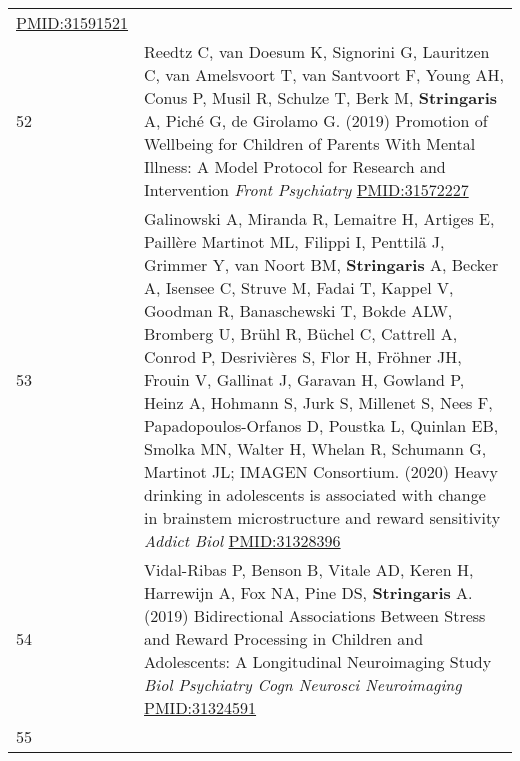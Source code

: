 \documentclass[
]{article}
\begin{document}
\begin{longtable}[]{@{}ll@{}}
\begin{minipage}[t]{0.94\columnwidth}
\url{PMID:31591521}\strut
\end{minipage}\tabularnewline
\begin{minipage}[t]{0.01\columnwidth}\raggedright
52\strut
\end{minipage} & \begin{minipage}[t]{0.94\columnwidth}\raggedright
Reedtz C, van Doesum K, Signorini G, Lauritzen C, van Amelsvoort T, van
Santvoort F, Young AH, Conus P, Musil R, Schulze T, Berk M,
\textbf{Stringaris} A, Piché G, de Girolamo G. (2019) Promotion of
Wellbeing for Children of Parents With Mental Illness: A Model Protocol
for Research and Intervention \emph{Front Psychiatry}
\url{PMID:31572227}\strut
\end{minipage}\tabularnewline
\begin{minipage}[t]{0.01\columnwidth}\raggedright
53\strut
\end{minipage} & \begin{minipage}[t]{0.94\columnwidth}\raggedright
Galinowski A, Miranda R, Lemaitre H, Artiges E, Paillère Martinot ML,
Filippi I, Penttilä J, Grimmer Y, van Noort BM, \textbf{Stringaris} A,
Becker A, Isensee C, Struve M, Fadai T, Kappel V, Goodman R,
Banaschewski T, Bokde ALW, Bromberg U, Brühl R, Büchel C, Cattrell A,
Conrod P, Desrivières S, Flor H, Fröhner JH, Frouin V, Gallinat J,
Garavan H, Gowland P, Heinz A, Hohmann S, Jurk S, Millenet S, Nees F,
Papadopoulos-Orfanos D, Poustka L, Quinlan EB, Smolka MN, Walter H,
Whelan R, Schumann G, Martinot JL; IMAGEN Consortium. (2020) Heavy
drinking in adolescents is associated with change in brainstem
microstructure and reward sensitivity \emph{Addict Biol}
\url{PMID:31328396}\strut
\end{minipage}\tabularnewline
\begin{minipage}[t]{0.01\columnwidth}\raggedright
54\strut
\end{minipage} & \begin{minipage}[t]{0.94\columnwidth}\raggedright
Vidal-Ribas P, Benson B, Vitale AD, Keren H, Harrewijn A, Fox NA, Pine
DS, \textbf{Stringaris} A. (2019) Bidirectional Associations Between
Stress and Reward Processing in Children and Adolescents: A Longitudinal
Neuroimaging Study \emph{Biol Psychiatry Cogn Neurosci Neuroimaging}
\url{PMID:31324591}\strut
\end{minipage}\tabularnewline
\begin{minipage}[t]{0.01\columnwidth}\raggedright
55\strut
\end{minipage} & \begin{minipage}[t]{0.94\columnwidth}\raggedright

\end{minipage}
\end{longtable}
\end{document}

